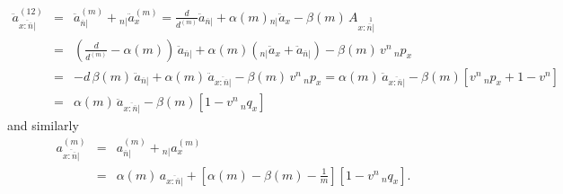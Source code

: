 \documentclass[11pt,fleqn,oneside]{book}
\begin{document}
\begin{itemize}
\begin{eqnarray*}
\ddot{a}_{\overline{x:\overline{n}|}}^{(12)} &=& \ddot{a}_{\overline{n}|}^{(m)} +  {_{n|}\ddot{a}_x^{(m)}} = \frac{d}{d^{(m)}} \ddot{a}_{\overline{n}|} + \alpha(m) {_{n|}\ddot{a}_x} - \beta(m)\,A_{x:\stackrel{1}{\overline{n}|}}\\
&=& \left(\frac{d}{d^{(m)}} -  \alpha(m)\right)\, \ddot{a}_{\overline{n}|}+  \alpha(m)\left( {_{n|}\ddot{a}_x} +  \ddot{a}_{\overline{n}|}\right) - \beta(m)\, v^n\,{_np_x}\\
&=& -d\,\beta(m)\, \ddot{a}_{\overline{n}|} + \alpha(m)\, \ddot{a}_{\overline{x:\overline{n}|}} 
 - \beta(m)\, v^n\,{_np_x} =  \alpha(m)\, \ddot{a}_{\overline{x:\overline{n}|}}  - \beta(m) \left[v^n\,{_np_x} + 1 - v^n\right]\\
 &=&  \alpha(m)\, \ddot{a}_{\overline{x:\overline{n}|}}  - \beta(m) \left[1-v^n\,{_nq_x}\right]
 \end{eqnarray*}
 and similarly
 \begin{eqnarray*}
 a_{\overline{x:\overline{n}|}}^{(m)} &=& a_{\overline{n}|}^{(m)} +  {_{n|}a_x^{(m)}} \\
  &=&  \alpha(m)\, a_{\overline{x:\overline{n}|}}  + \left[\alpha(m) - \beta(m) - \frac{1}{m} \right] \left[1-v^n\,{_nq_x}\right].
 \end{eqnarray*}
\end{itemize}
\end{document}
